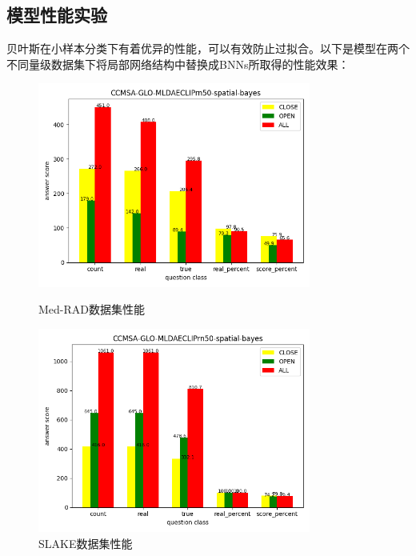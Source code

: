 \subsection{模型性能实验}
贝叶斯在小样本分类下有着优异的性能，可以有效防止过拟合。以下是模型在两个不同量级数据集下将局部网络结构中替换成BNNs所取得的性能效果：
\begin{figure}[htbp]
	\begin{minipage}{0.5\linewidth}
		\centering	
		\includegraphics[width=0.8\textwidth]{Fig/myfig/chapter4/modal_bayes_medrad.png}  %
		\caption{\label{modal_bayes_medrad}Med-RAD数据集性能} 	
	\end{minipage}
	\begin{minipage}{0.5\linewidth}
		\centering	
		\includegraphics[width=0.8\textwidth]{Fig/myfig/chapter4/modal_bayes_slake.png}  %
		\caption{\label{modal_bayes_slake}SLAKE数据集性能} 	
	\end{minipage}	
\end{figure}
